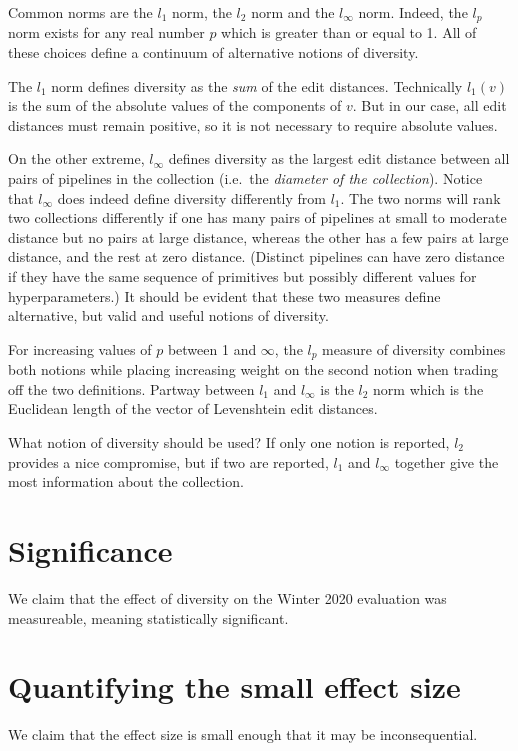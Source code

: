 \documentclass{article}
\begin{document}
  Common norms are the $l_1$ norm, the $l_2$ norm and the $l_\infty$
  norm.  Indeed, the $l_p$ norm exists for any real number $p$ which
  is greater than or equal to 1.  All of these choices define a
  continuum of alternative notions of diversity.

  The $l_1$ norm defines diversity as the \emph{sum} of the edit
  distances.  Technically $l_1(v)$ is the sum of the absolute values
  of the components of $v$.  But in our case, all edit distances must
  remain positive, so it is not necessary to require absolute values.

  On the other extreme, $l_\infty$ defines diversity as the largest
  edit distance between all pairs of pipelines in the collection
  (i.e.\ the \emph{diameter of the collection}).  Notice that
  $l_\infty$ does indeed define diversity differently from $l_1$.  The
  two norms will rank two collections differently if one has many
  pairs of pipelines at small to moderate distance but no pairs at
  large distance, whereas the other has a few pairs at large distance,
  and the rest at zero distance.  (Distinct pipelines can have zero
  distance if they have the same sequence of primitives but possibly
  different values for hyperparameters.)  It should be evident that
  these two measures define alternative, but valid and useful notions
  of diversity.

  For increasing values of $p$ between 1 and $\infty$, the $l_p$
  measure of diversity combines both notions while placing increasing
  weight on the second notion when trading off the two definitions.
  Partway between $l_1$ and $l_\infty$ is the $l_2$ norm which is the
  Euclidean length of the vector of Levenshtein edit distances.

  What notion of diversity should be used?  If only one notion is
  reported, $l_2$ provides a nice compromise, but if two are reported,
  $l_1$ and $l_\infty$ together give the most information about the
  collection.

  \section{Significance}
  We claim that the effect of diversity on the Winter 2020 evaluation
  was measureable, meaning statistically significant.

  \section{Quantifying the small effect size}
  We claim that the effect size is small enough that it may be
  inconsequential.
  
  
\end{document}
